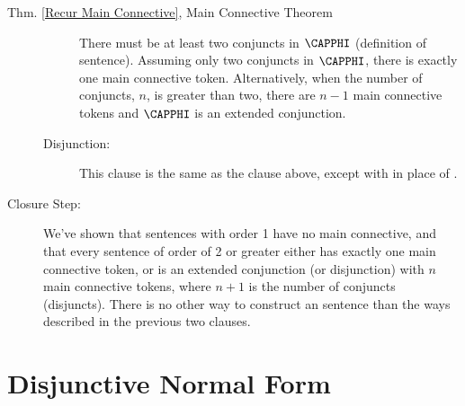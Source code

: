 \begin{PROOFOF}{Thm. \ref{Recur Main Connective}, Main Connective Theorem}
\begin{description}
\begin{description}
There must be at least two conjuncts in $\CAPPHI$ (definition of \GSL{} sentence). Assuming only two conjuncts in $\CAPPHI$, there is exactly one main connective token.  Alternatively, when the number of conjuncts, $n$, is greater than two, there are $n-1$ main connective tokens and $\CAPPHI$ is an extended conjunction.

\item[Disjunction:]
This clause is the same as the  clause above, except with \mention{$\VEE$} in place of \mention{$\WEDGE$}.


\end{description}

\item[Closure Step:] 
We've shown that sentences with order 1 have no main connective, and that every sentence of order of 2 or greater either has exactly one main connective token, or is an extended conjunction (or disjunction) with $n$ main connective tokens, where $n+1$ is the number of conjuncts (disjuncts).  There is no other way to construct an \GSL{} sentence than the ways described in the previous two clauses.

\end{description}
\end{PROOFOF}

\section[Disjunctive Normal Form]{Disjunctive Normal Form}\label{DNF and the TFE Replacement Theorem}

